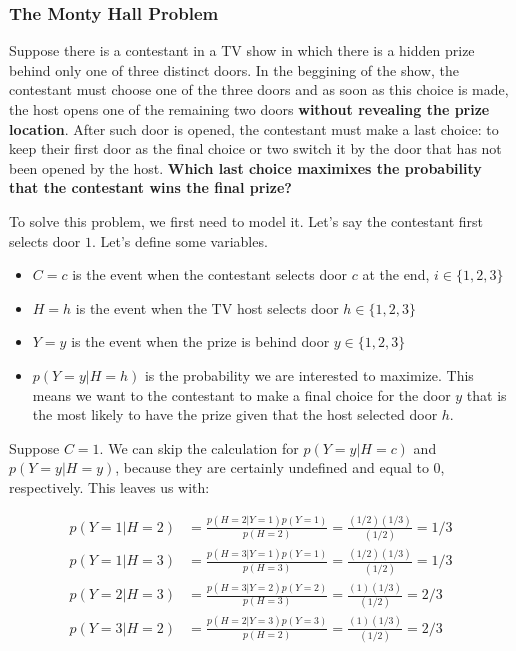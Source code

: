 \documentclass{article}
\begin{document}
\subsubsection{The Monty Hall Problem}

\begin{question}
	Suppose there is a contestant in a TV show in which there is a hidden prize behind only one of three distinct doors. In the beggining of the show, the contestant must choose one of the three doors and as soon as this choice is made, the host opens one of the remaining two doors \textbf{without revealing the prize location}. After such door is opened, the contestant must make a last choice: to keep their first door as the final choice or two switch it by the door that has not been opened by the host. \textbf{Which last choice maximixes the probability that the contestant wins the final prize?}
	
	To solve this problem, we first need to model it. Let's say the contestant first selects door $1$. Let's define some variables.
	
	\begin{itemize}
		\item  $C = c $ is the event when the contestant selects door $c$ at the end, $i \in \{1,2,3\}$
		\item  $H = h$ is the event when the TV host selects door $h \in \{1,2,3\}$
		\item $Y = y$ is the event when the prize is behind door $y \in \{1,2,3\}$
		\item $p(Y = y | H = h)$ is the probability we are interested to maximize. This means we want to the contestant to make a final choice for the door $y$ that is the most likely to have the prize given that the host selected door $h$.
	\end{itemize}
	
	Suppose $C = 1$. We can skip the calculation for $p(Y = y | H = c)$ and $p(Y = y | H = y)$, because they are certainly undefined and equal to $0$, respectively. This leaves us with:
	
	\begin{align}
		 p(Y = 1 | H = 2) &= \frac{p(H = 2 | Y = 1) p(Y = 1)}{p(H = 2)} = \frac{(1/2) (1/3)}{(1/2)} = 1/3 \\
		 p(Y = 1 | H = 3) &= \frac{p(H = 3 | Y = 1) p(Y = 1)}{p(H = 3)} = \frac{(1/2) (1/3)}{(1/2)} = 1/3 \\
		 p(Y = 2 | H = 3) &= \frac{p(H = 3 | Y = 2) p(Y = 2)}{p(H = 3)} = \frac{(1) (1/3)}{(1/2)} = 2/3 \\
		 p(Y = 3 | H = 2) &= \frac{p(H = 2 | Y = 3) p(Y = 3)}{p(H = 2)} = \frac{(1) (1/3)}{(1/2)} = 2/3 \\
	\end{align}
	

\end{question}
\end{document}
